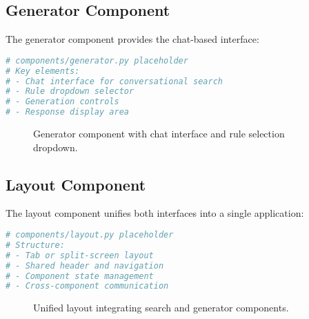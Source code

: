 \subsection{Generator Component}

The generator component provides the chat-based interface:

\begin{lstlisting}[language=Python, caption={Generator component structure}, label={lst:generator-component}]
# components/generator.py placeholder
# Key elements:
# - Chat interface for conversational search
# - Rule dropdown selector
# - Generation controls
# - Response display area
\end{lstlisting}

\begin{figure}[ht]
\centering
{}
\caption{Generator component with chat interface and rule selection dropdown.}
\label{fig:generator-interface}
\end{figure}

\subsection{Layout Component}

The layout component unifies both interfaces into a single application:

\begin{lstlisting}[language=Python, caption={Layout component combining interfaces}, label={lst:layout-component}]
# components/layout.py placeholder
# Structure:
# - Tab or split-screen layout
# - Shared header and navigation
# - Component state management
# - Cross-component communication
\end{lstlisting}

\begin{figure}[ht]
\centering
{}
\caption{Unified layout integrating search and generator components.}
\label{fig:unified-layout}
\end{figure}

